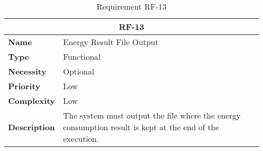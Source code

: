 \begin{table}[H]
    \centering
    \begin{tabular}{l p{10cm}}
        \toprule
        \multicolumn{2}{c}{\textbf{RF-13}} \\
        \toprule
        \textbf{Name}               & Energy Result File Output \\
        \textbf{Type}               & Functional \\
        \textbf{Necessity}          & Optional \\
        \textbf{Priority}           & Low \\
        \textbf{Complexity}         & Low \\
        \textbf{Description}        & The system must output the file where the energy consumption result is kept at the end of the execution. \\
        \bottomrule
    \end{tabular}
\caption{Requirement RF-13}\label{tab:rf-13}
\end{table}